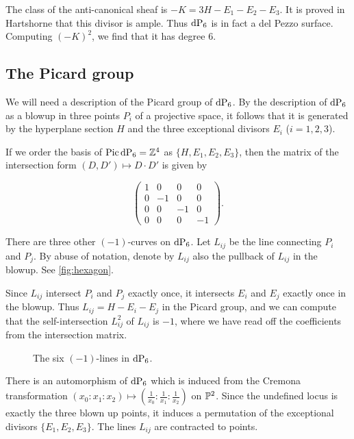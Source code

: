 The class of the anti-canonical sheaf is $-K = 3H - E_1 - E_2 - E_3$. It is proved in Hartshorne that this divisor is ample. Thus $\dP6$ is in fact a del Pezzo surface. Computing $(-K)^2$, we find that it has degree $6$.

\subsection{The Picard group}

We will need a description of the Picard group of $\dP6$. By the description of $\dP6$ as a blowup in three points $P_i$ of a projective space, it follows that it is generated by the hyperplane section $H$ and the three exceptional divisors $E_i$ ($i=1,2,3$).

If we order the basis of $\Pic \dP6 = \Z^4$ as $\{ H, E_1, E_2, E_3 \}$, then the matrix of the intersection form $(D,D') \mapsto D \cdot D'$ is given by 

\[
\begin{pmatrix}
1 & 0 & 0 & 0 \\
0 & -1 & 0 & 0 \\
0 & 0  &-1 & 0 \\
0 & 0  & 0 & -1
\end{pmatrix}.
\]

There are three other $(-1)$-curves on $\dP6$. Let $L_{ij}$ be the line connecting $P_i$ and $P_j$. By abuse of notation, denote by $L_{ij}$ also the pullback of $L_{ij}$ in the blowup. See \cref{fig:hexagon}.

Since $L_{ij}$ intersect $P_i$ and $P_j$ exactly once, it intersects $E_i$ and $E_j$ exactly once in the blowup. Thus $L_{ij}=H-E_i-E_j$ in the Picard group, and we can compute that the self-intersection $L_{ij}^2$ of $L_{ij}$ is $-1$, where we have read off the coefficients from the intersection matrix.

\begin{figure}
\centering 

\caption{The six $(-1)$-lines in $\dP6$.}
\label{fig:blowup_hexagon}
\end{figure}

There is an automorphism of $\dP6$ which is induced from the Cremona transformation $(x_0:x_1:x_2) \mapsto \left( \frac 1{x_0} : \frac 1{x_1} : \frac 1{x_2}\right)$ on $\P^2$. Since the undefined locus is exactly the three blown up points, it induces a permutation of the exceptional divisors $\{E_1,E_2,E_3\}$. The lines $L_{ij}$ are contracted to points.

